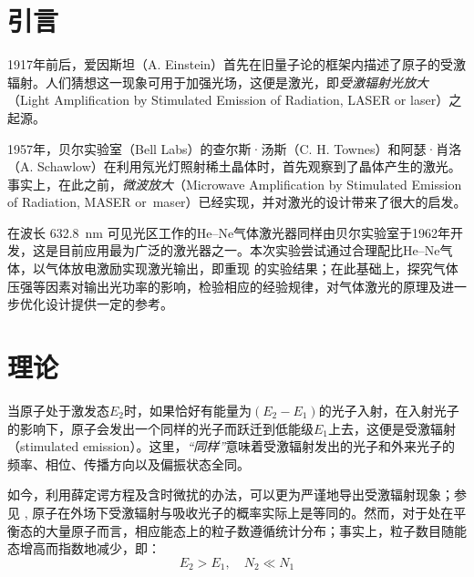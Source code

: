\documentclass[aps,pre,12pt,preprint,%
	onecolumn,showpacs,showkeys,nofootinbib]{revtex4-1}
\begin{document}
\section{引言}
	1917年前后，爱因斯坦（A. Einstein）首先在旧量子论的框架内描述了原子的受激辐射\supercite{einstein1917quantentheorie}。人们猜想这一现象可用于加强光场，这便是激光，即\textit{受激辐射光放大}（Light Amplification by
	Stimulated Emission of Radiation, LASER or laser）之起源。
	
	1957年，贝尔实验室（Bell Labs）的查尔斯·汤斯（C. H. Townes）和阿瑟·肖洛（A. Schawlow）在利用氖光灯照射稀土晶体时，首先观察到了晶体产生的激光\supercite{schawlow1958infrared}。事实上，在此之前，\textit{微波放大}（Microwave Amplification by Stimulated Emission of Radiation, MASER or~maser）已经实现，并对激光的设计带来了很大的启发\supercite{townes1999laser}。
	
	在波长 \SI{632.8}{\nm} 可见光区工作的He--Ne气体激光器同样由贝尔实验室于1962年开发，这是目前应用最为广泛的激光器之一\supercite{white1962continuous}。本次实验尝试通过合理配比He--Ne气体，以气体放电激励实现激光输出，即重现 \cite{white1962continuous} 的实验结果；在此基础上，探究气体压强等因素对输出光功率的影响，检验相应的经验规律，对气体激光的原理及进一步优化设计提供一定的参考。
\section{理论}
	当原子处于激发态$E_2$时，如果恰好有能量为$(E_2-E_1)$的光子入射，在入射光子的影响下，原子会发出一个同样的光子而跃迁到低能级$E_1$上去，这便是受激辐射（stimulated emission）。这里，\textit{“同样”}意味着受激辐射发出的光子和外来光子的频率、相位、传播方向以及偏振状态全同。
	
	如今，利用薛定谔方程及含时微扰的办法，可以更为严谨地导出受激辐射现象；参见 \cite{griffiths2016introduction}, 原子在外场下受激辐射与吸收光子的概率实际上是等同的。然而，对于处在平衡态的大量原子而言，相应能态上的粒子数遵循统计分布；事实上，粒子数目随能态增高而指数地减少，即：\vspace{-2ex}
	\begin{equation}
		E_2 > E_1,\quad N_2 \ll N_1
	\end{equation}
	
\end{document}
